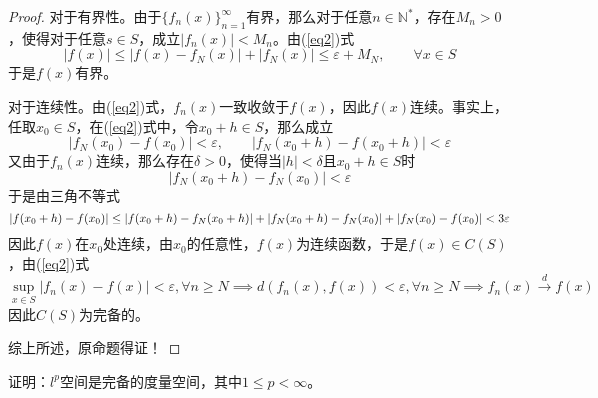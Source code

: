 \documentclass[lang = cn, scheme = chinese, 10pt]{elegantbook}
\newcommand{\N}{\mathbb{N}}  %
\begin{document}
\begin{proof}
	对于有界性。由于$\{f_n(x)\}_{n=1}^{\infty}$有界，那么对于任意$n\in\N^*$，存在$M_n>0$，使得对于任意$s\in S$，成立$|f_n(x)|<M_n$。由(\ref{eq2})式
	$$
	|f(x)|\le |f(x)-f_{N}(x)|+|f_{N}(x)|\le \varepsilon+M_{N},\qquad \forall x\in S
	$$
	于是$f(x)$有界。
	
	对于连续性。由(\ref{eq2})式，$f_n(x)$一致收敛于$f(x)$，因此$f(x)$连续。事实上，任取$x_0\in S$，在(\ref{eq2})式中，令$x_0+h\in S$，那么成立
	$$
	|f_N(x_0)-f(x_0)|<\varepsilon,\qquad |f_N(x_0+h)-f(x_0+h)|<\varepsilon
	$$
	又由于$f_n(x)$连续，那么存在$\delta>0$，使得当$|h|<\delta$且$x_0+h\in S$时
	$$
	|f_N(x_0+h)-f_N(x_0)|<\varepsilon
	$$
	于是由三角不等式
	$$
	\small{
		|f(x_0+h)-f(x_0)|\le |f(x_0+h)-f_N(x_0+h)|+|f_N(x_0+h)-f_N(x_0)|+|f_N(x_0)-f(x_0)|<3\varepsilon
	}
	$$
	因此$f(x)$在$x_0$处连续，由$x_0$的任意性，$f(x)$为连续函数，于是$f(x)\in C(S)$，由(\ref{eq2})式
	$$
	\sup_{x\in S}|f_n(x)-f(x)|<\varepsilon,\forall n\ge N\implies d(f_n(x),f(x))<\varepsilon,\forall n\ge N\implies f_n(x)\xrightarrow{d}f(x)
	$$
	因此$C(S)$为完备的。
	
	综上所述，原命题得证！
\end{proof}

\begin{proposition}
	证明：$l^p$空间是完备的度量空间，其中$1\le p <\infty$。
\end{proposition}
\end{document}

